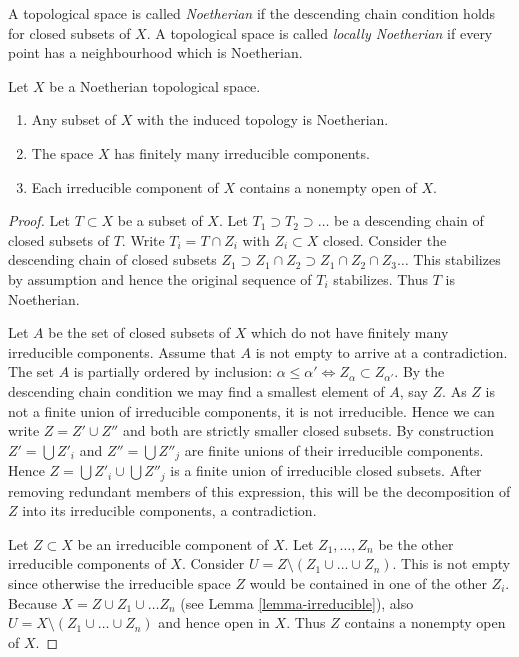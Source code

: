 \begin{definition}
\label{definition-noetherian}
A topological space is called {\it Noetherian}
if the descending chain condition holds for
closed subsets of $X$. A topological space is called
{\it locally Noetherian} if every point has a neighbourhood
which is Noetherian.
\end{definition}

\begin{lemma}
\label{lemma-Noetherian}
Let $X$ be a Noetherian topological space.
\begin{enumerate}
\item Any subset of $X$ with the induced topology is Noetherian.
\item The space $X$ has finitely many irreducible components.
\item Each irreducible component of $X$ contains a nonempty open of $X$.
\end{enumerate}
\end{lemma}

\begin{proof}
Let $T \subset X$ be a subset of $X$.
Let $T_1 \supset T_2 \supset \ldots$
be a descending chain of closed subsets of $T$.
Write $T_i =  T \cap Z_i$ with $Z_i \subset X$ closed.
Consider the descending chain of closed subsets
$Z_1 \supset Z_1\cap Z_2 \supset Z_1 \cap Z_2 \cap Z_3 \ldots$
This stabilizes by assumption and hence the original sequence
of $T_i$ stabilizes. Thus $T$ is Noetherian.

\medskip\noindent
Let $A$ be the set of closed subsets of $X$ which do not
have finitely many irreducible components. Assume that
$A$ is not empty to arrive at a contradiction.
The set $A$ is partially ordered by inclusion: $\alpha \leq \alpha'
\Leftrightarrow Z_{\alpha} \subset Z_{\alpha'}$.
By the descending chain condition we may find a
smallest element of $A$, say $Z$. As $Z$ is not a finite
union of irreducible components, it is not irreducible.
Hence we can write $Z = Z' \cup Z''$ and both are strictly smaller
closed subsets. By construction $Z' = \bigcup Z'_i$ and
$Z'' = \bigcup Z''_j$ are finite unions of their irreducible
components. Hence $Z = \bigcup Z'_i \cup \bigcup Z''_j$ is
a finite union of irreducible closed subsets.
After removing redundant members of this expression,
this will be the decomposition of $Z$ into its irreducible
components, a contradiction.

\medskip\noindent
Let $Z \subset X$ be an irreducible component of $X$.
Let $Z_1, \ldots, Z_n$ be the other irreducible components
of $X$. Consider $U = Z \setminus (Z_1\cup\ldots\cup Z_n)$.
This is not empty since otherwise the irreducible space
$Z$ would be contained in one of the other $Z_i$.
Because $X = Z \cup Z_1 \cup \ldots Z_n$ (see Lemma \ref{lemma-irreducible}),
also $U = X \setminus (Z_1\cup\ldots\cup Z_n)$
and hence open in $X$. Thus $Z$ contains a nonempty
open of $X$.
\end{proof}

